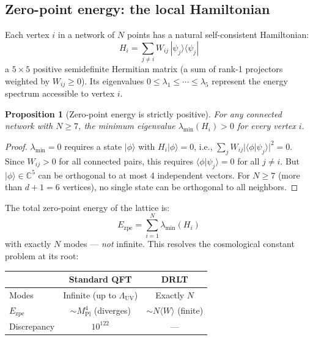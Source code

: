 \documentclass[12pt]{article}
\newtheorem{proposition}[theorem]{Proposition}
\theoremstyle{remark}
\theoremstyle{definition}
\newcommand{\CC}{\mathbb{C}}
\begin{document}
\subsection{Zero-point energy: the local Hamiltonian}

Each vertex $i$ in a network of $N$ points has a natural self-consistent Hamiltonian:
\begin{equation}
H_i = \sum_{j \neq i} W_{ij}\,|\psi_j\rangle\langle\psi_j|
\end{equation}
a $5\times 5$ positive semidefinite Hermitian matrix (a sum of rank-1 projectors weighted by $W_{ij} \geq 0$). Its eigenvalues $0 \leq \lambda_1 \leq \cdots \leq \lambda_5$ represent the energy spectrum accessible to vertex $i$.

\begin{proposition}[Zero-point energy is strictly positive]
For any connected network with $N \geq 7$, the minimum eigenvalue $\lambda_{\min}(H_i) > 0$ for every vertex $i$.
\end{proposition}

\begin{proof}
$\lambda_{\min} = 0$ requires a state $|\phi\rangle$ with $H_i|\phi\rangle = 0$, i.e., $\sum_j W_{ij}|\langle\phi|\psi_j\rangle|^2 = 0$. Since $W_{ij} > 0$ for all connected pairs, this requires $\langle\phi|\psi_j\rangle = 0$ for all $j \neq i$. But $|\phi\rangle \in \CC^5$ can be orthogonal to at most 4 independent vectors. For $N \geq 7$ (more than $d + 1 = 6$ vertices), no single state can be orthogonal to all neighbors.
\end{proof}

The total zero-point energy of the lattice is:
\begin{equation}
E_\text{zpe} = \sum_{i=1}^{N} \lambda_{\min}(H_i)
\end{equation}
with exactly $N$ modes --- \emph{not} infinite. This resolves the cosmological constant problem at its root:

\begin{center}
\begin{tabular}{lcc}
\hline
& Standard QFT & DRLT \\
\hline
Modes & Infinite (up to $\Lambda_\text{UV}$) & Exactly $N$ \\
$E_\text{zpe}$ & $\sim M_\text{Pl}^4$ (diverges) & $\sim N\langle W\rangle$ (finite) \\
Discrepancy & $10^{122}$ & --- \\
\hline
\end{tabular}
\end{center}
\end{document}
